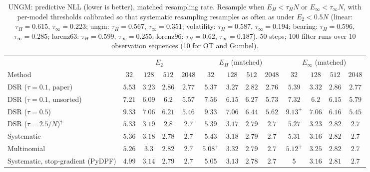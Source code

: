 \begin{table}[ht]
\centering
\small
\caption{UNGM: predictive NLL (lower is better), matched resampling rate. Resample when $E_H<\tau_HN$ or $E_\infty<\tau_\infty N$, with per-model thresholds calibrated so that systematic resampling resamples as often as under $E_2<0.5N$ (linear: $\tau_H{=}0.615$, $\tau_\infty{=}0.223$; ungm: $\tau_H{=}0.567$, $\tau_\infty{=}0.351$; volatility: $\tau_H{=}0.587$, $\tau_\infty{=}0.194$; bearing: $\tau_H{=}0.596$, $\tau_\infty{=}0.285$; lorenz63: $\tau_H{=}0.599$, $\tau_\infty{=}0.255$; lorenz96: $\tau_H{=}0.62$, $\tau_\infty{=}0.187$). 50 steps; 100 filter runs over 10 observation sequences (10 for OT and Gumbel).}
\label{tab:trigger-matched-ungm-predictive_nll}
\begin{adjustbox}{max width=\linewidth}
\begin{tabular}{lcccc|cccc|cccc}
\toprule
 & \multicolumn{4}{c}{$E_2$} & \multicolumn{4}{c}{$E_H$ (matched)} & \multicolumn{4}{c}{$E_\infty$ (matched)} \\
\cmidrule(lr){2-5} \cmidrule(lr){6-9} \cmidrule(lr){10-13}
Method & $32$ & $128$ & $512$ & $2048$ & $32$ & $128$ & $512$ & $2048$ & $32$ & $128$ & $512$ & $2048$ \\
\midrule
DSR ($\tau{=}0.1$, paper) & $5.53$ & $\mathbf{3.23}$ & $2.86$ & $2.77$ & $\mathbf{5.37}$ & $3.27$ & $\mathbf{2.82}$ & $\mathbf{2.76}$ & $5.39$ & $3.32$ & $2.86$ & $2.77$ \\
DSR ($\tau{=}0.1$, unsorted) & $\mathbf{7.21}$ & $\mathbf{6.09}$ & $6.2$ & $\mathbf{5.57}$ & $7.56$ & $6.15$ & $6.27$ & $5.73$ & $7.32$ & $6.2$ & $\mathbf{6.15}$ & $5.79$ \\
DSR ($\tau{=}0.5$) & $9.33$ & $7.06$ & $6.21$ & $5.46$ & $9.33$ & $7.06$ & $6.44$ & $5.62$ & $\mathbf{9.13}^{+}$ & $\mathbf{7.06}$ & $\mathbf{6.16}$ & $\mathbf{5.45}$ \\
DSR ($\tau{=}2.5/N$)$^\dagger$ & $5.33$ & $3.19$ & $2.8$ & $2.7$ & $5.39$ & $\mathbf{3.17}$ & $\mathbf{2.79}$ & $2.7$ & $\mathbf{5.27}$ & $3.23$ & $2.82$ & $\mathbf{2.7}$ \\
\midrule
Systematic & $5.36$ & $3.18$ & $\mathbf{2.78}$ & $2.7$ & $5.43$ & $3.18$ & $2.79$ & $\mathbf{2.7}$ & $\mathbf{5.31}$ & $\mathbf{3.16}$ & $2.82$ & $2.7$ \\
Multinomial & $5.26$ & $3.3$ & $2.82$ & $\mathbf{2.7}$ & $\mathbf{5.08}^{+}$ & $3.32$ & $\mathbf{2.79}$ & $2.7$ & $5.12^{+}$ & $\mathbf{3.25}$ & $2.82$ & $2.7$ \\
Systematic, stop-gradient (PyDPF) & $\mathbf{4.99}$ & $3.14$ & $2.79$ & $2.7$ & $5.05$ & $\mathbf{3.13}$ & $\mathbf{2.78}$ & $2.7$ & $5$ & $3.16$ & $2.81$ & $\mathbf{2.7}$ \\

\end{tabular}
\end{adjustbox}
\end{table}
